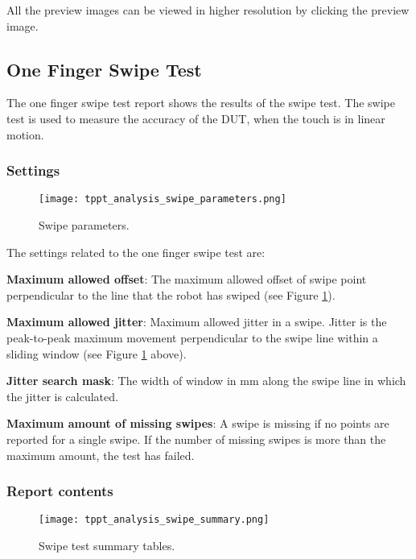 All the preview images can be viewed in higher resolution by clicking the preview image.

\subsection{One Finger Swipe Test}

The one finger swipe test report shows the results of the swipe test. The swipe test is used to measure the accuracy of the DUT, when the touch is in linear motion.

\subsubsection{Settings}

\begin{figure}[!h]
	\centering
	\texttt{[image: tppt\_analysis\_swipe\_parameters.png]}
	\caption{Swipe parameters.}
	\label{fig:tppt_analysis_swipe_parameters}
\end{figure}

The settings related to the one finger swipe test are:

\textbf{Maximum allowed offset}: The maximum allowed offset of swipe point perpendicular to the line that the robot has swiped (see Figure \ref{fig:tppt_analysis_swipe_parameters}). 

\textbf{Maximum allowed jitter}: Maximum allowed jitter in a swipe. Jitter is the peak-to-peak maximum movement perpendicular to the swipe line within a sliding window (see Figure \ref{fig:tppt_analysis_swipe_parameters} above). 

\textbf{Jitter search mask}: The width of window in mm along the swipe line in which the jitter is calculated. 

\textbf{Maximum amount of missing swipes}: A swipe is missing if no points are reported for a single swipe. If the number of missing swipes is more than the maximum amount, the test has failed.

\subsubsection{Report contents}

\begin{figure}[!h]
	\centering
	\texttt{[image: tppt\_analysis\_swipe\_summary.png]}
	\caption{Swipe test summary tables.}
	\label{fig:tppt_analysis_swipe_summary}
\end{figure}

